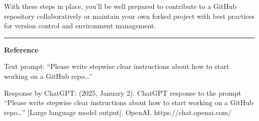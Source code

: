 \documentclass[
  letterpaper,
  DIV=11,
  numbers=noendperiod]{scrartcl}
\begin{document}
With these steps in place, you'll be well prepared to contribute to a
GitHub repository collaboratively or maintain your own forked project
with best practices for version control and environment management.

\begin{center}\rule{0.5\linewidth}{0.5pt}\end{center}

\textbf{Reference}

Text prompt: ``Please write stepwise clear instructions about how to
start working on a GitHub repo\ldots{}''

Response by ChatGPT: (2025, January 2). ChatGPT response to the prompt
``Please write stepwise clear instructions about how to start working on
a GitHub repo\ldots{}'' {[}Large language model output{]}. OpenAI.
https://chat.openai.com/
\end{document}
